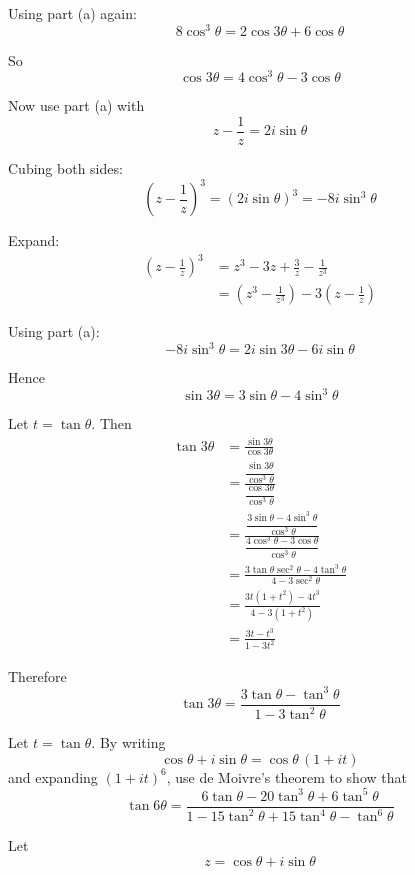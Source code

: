 \documentclass[leqno]{article}
\begin{document}
\begin{enumerate}[
  label=\textbf{\arabic*.},
  leftmargin=*,
  topsep=0pt,
  partopsep=0pt,
  parsep=0pt
]
\begin{djsSolution}
\begin{enumerate}[label=\textbf{(\alph*)}]
Using part (a) again:
\[
8\cos^3\theta=2\cos3\theta+6\cos\theta
\]

So
\[
\cos3\theta=4\cos^3\theta-3\cos\theta
\]

Now use part (a) with
\[
z-\frac{1}{z}=2i\sin\theta
\]

Cubing both sides:
\[
\left(z-\frac{1}{z}\right)^3=(2i\sin\theta)^3=-8i\sin^3\theta
\]

Expand:
\begin{align*}
\left(z-\frac{1}{z}\right)^3
&=z^3-3z+\frac{3}{z}-\frac{1}{z^3} \\
&=\left(z^3-\frac{1}{z^3}\right)-3\left(z-\frac{1}{z}\right)
\end{align*}

Using part (a):
\[
-8i\sin^3\theta=2i\sin3\theta-6i\sin\theta
\]

Hence
\[
\sin3\theta=3\sin\theta-4\sin^3\theta
\]

Let $t=\tan\theta$. Then
\begin{align*}
\tan3\theta
&=\frac{\sin3\theta}{\cos3\theta} \\
&=\frac{\dfrac{\sin3\theta}{\cos^3\theta}}{\dfrac{\cos3\theta}{\cos^3\theta}} \\
&=\frac{\dfrac{3\sin\theta-4\sin^3\theta}{\cos^3\theta}}{\dfrac{4\cos^3\theta-3\cos\theta}{\cos^3\theta}} \\
&=\frac{3\tan\theta\sec^2\theta-4\tan^3\theta}{4-3\sec^2\theta} \\
&=\frac{3t(1+t^2)-4t^3}{4-3(1+t^2)} \\
&=\frac{3t-t^3}{1-3t^2}
\end{align*}

Therefore
\[
\tan3\theta=\frac{3\tan\theta-\tan^3\theta}{1-3\tan^2\theta}
\]
\end{enumerate}
\end{djsSolution}


\newpage

\questionitem

Let $t=\tan\theta$. By writing
\[
\cos\theta+i\sin\theta=\cos\theta\,(1+it)
\]
and expanding $(1+it)^6$, use de Moivre's theorem to show that
\[
\tan 6\theta=\frac{6\tan\theta-20\tan^3\theta+6\tan^5\theta}{1-15\tan^2\theta+15\tan^4\theta-\tan^6\theta}
\]

\vspace*{10pt}

\begin{djsSolution}
Let
\[
z=\cos\theta+i\sin\theta
\]


\end{djsSolution}
\end{enumerate}
\end{document}
